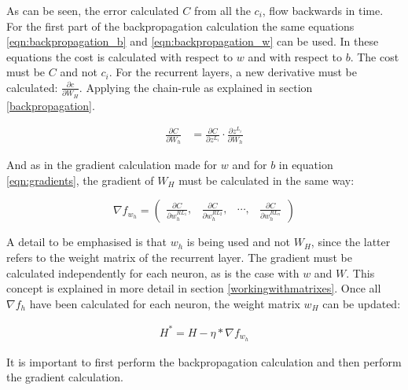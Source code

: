 As can be seen, the error calculated $C$ from all the $c_i$, flow backwards in time. For the first part of the backpropagation calculation the same equations \ref{eqn:backpropagation_b} and \ref{eqn:backpropagation_w} can be used. In these equations the cost is calculated with respect to $w$ and with respect to $b$. The cost must be $C$ and not $c_i$. For the recurrent layers, a new derivative must be calculated: $\frac{\partial c}{\partial W_H}$. Applying the chain-rule as explained in section \ref{backpropagation}.

\begin{equation}
\begin{split}
     \frac{\partial C}{\partial W_h} &= \frac{\partial C}{\partial z^{L_i}} \cdot \frac{\partial z^{L_i}}{\partial W_h}
\end{split}
\label{eqn:backpropagation_h}
\end{equation}

And as in the gradient calculation made for $w$ and for $b$ in equation \ref{eqn:gradients}, the gradient of $W_H$ must be calculated in the same way:

\begin{equation}
    \nabla f_{w_h} = \begin{pmatrix} \frac{\partial C}{\partial w_h^{RL_1}}, & \frac{\partial C}{\partial w_h^{RL_2}}, & \cdots , &  \frac{\partial C}{\partial w_h^{RL_n}} \end{pmatrix}
\end{equation}

A detail to be emphasised is that $w_h$ is being used and not $W_H$, since the latter refers to the weight matrix of the recurrent layer. The gradient must be calculated independently for each neuron, as is the case with $w$ and $W$. This concept is explained in more detail in section \ref{workingwithmatrixes}. Once all $\nabla f_h$ have been calculated for each neuron, the weight matrix $w_{H}$ can be updated:

\begin{equation}
    \begin{split}
    H^* = H - \eta * \nabla f_{w_h}
    \end{split}
\end{equation}

It is important to first perform the backpropagation calculation and then perform the gradient calculation.
\newline
